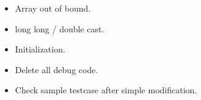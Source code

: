 \begin{itemize}
\item Array out of bound.
\item long long / double cast.
\item Initialization.
\item Delete all debug code.
\item Check sample testcase after simple modification.
\end{itemize}
